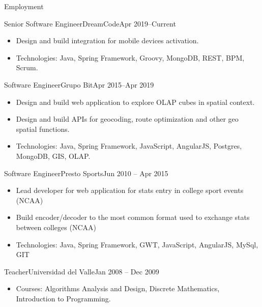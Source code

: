 \documentclass[]{mcdowellcv}
\begin{document}
	\makeheader
	
	\begin{cvsection}{Employment}
		\begin{cvsubsection}{Senior Software Engineer}{DreamCode}{Apr 2019--Current}
			\begin{itemize}
				\item Design and build integration for mobile devices activation.							
				\item Technologies: Java, Spring Framework, Groovy, MongoDB, REST, BPM, Scrum.		 			
			\end{itemize}
		\end{cvsubsection}

		\begin{cvsubsection}{Software Engineer}{Grupo Bit}{Apr 2015--Apr 2019}
			\begin{itemize}
				\item Design and build web application to explore OLAP cubes in spatial context.
				\item Design and build APIs for geocoding, route optimization and other geo spatial functions.
				\item Technologies: Java, Spring Framework, JavaScript, AngularJS, Postgres, MongoDB, GIS, OLAP.		 			
			\end{itemize}
		\end{cvsubsection}
		
		\begin{cvsubsection}{Software Engineer}{Presto Sports}{Jun 2010 -- Apr 2015}						
			\begin{itemize}
				\item Lead developer for web application for stats entry in college sport events (NCAA)
				\item Build encoder/decoder to the most common format used to exchange stats between colleges (NCAA)
				\item Technologies: Java, Spring Framework, GWT, JavaScript, AngularJS, MySql, GIT	
				
			\end{itemize}
		\end{cvsubsection}
%		
%		
		\begin{cvsubsection}{Teacher}{Universidad del Valle}{Jan 2008 -- Dec 2009}		
			\begin{itemize}
				\item Courses: Algorithms Analysis and Design, Discrete Mathematics, Introduction to Programming.			
			\end{itemize}
		\end{cvsubsection}
		

\end{cvsection}
\end{document}
